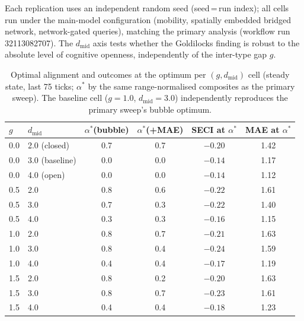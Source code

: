 Each replication uses an independent random seed (seed\,=\,run index); all
cells run under the main-model configuration (mobility, spatially embedded
bridged network, network-gated queries), matching the primary analysis
(workflow run 32113082707). The $d_{\mathrm{mid}}$ axis tests whether the
Goldilocks finding is robust to the absolute level of cognitive openness,
independently of the inter-type gap $g$.


\begin{table}[h]
\centering
\caption{Optimal alignment and outcomes at the optimum per
$(g, d_{\mathrm{mid}})$ cell (steady state, last 75 ticks; $\alpha^{*}$ by the
same range-normalised composites as the primary sweep). The baseline cell
($g = 1.0$, $d_{\mathrm{mid}} = 3.0$) independently reproduces the primary
sweep's bubble optimum.}
\label{tab:S7b}
\small
\begin{tabular}{llcccc}
\toprule
$g$ & $d_{\mathrm{mid}}$ & $\alpha^{*}$(bubble) & $\alpha^{*}$(+MAE) & SECI at $\alpha^{*}$ & MAE at $\alpha^{*}$ \\
\midrule
0.0 & 2.0 (closed)   & 0.7 & 0.7 & $-0.20$ & 1.42 \\
0.0 & 3.0 (baseline) & 0.0 & 0.0 & $-0.14$ & 1.17 \\
0.0 & 4.0 (open)     & 0.0 & 0.0 & $-0.14$ & 1.12 \\
0.5 & 2.0 & 0.8 & 0.6 & $-0.22$ & 1.61 \\
0.5 & 3.0 & 0.7 & 0.3 & $-0.22$ & 1.40 \\
0.5 & 4.0 & 0.3 & 0.3 & $-0.16$ & 1.15 \\
1.0 & 2.0 & 0.8 & 0.7 & $-0.21$ & 1.63 \\
1.0 & 3.0 & 0.8 & 0.4 & $-0.24$ & 1.59 \\
1.0 & 4.0 & 0.4 & 0.4 & $-0.17$ & 1.19 \\
1.5 & 2.0 & 0.8 & 0.2 & $-0.20$ & 1.63 \\
1.5 & 3.0 & 0.8 & 0.7 & $-0.23$ & 1.61 \\
1.5 & 4.0 & 0.4 & 0.4 & $-0.18$ & 1.23 \\
\bottomrule
\end{tabular}
\end{table}

